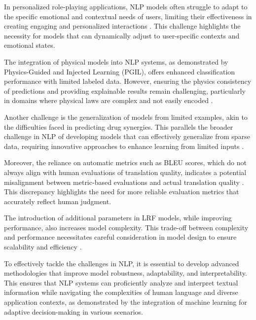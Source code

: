 In personalized role-playing applications, NLP models often struggle to adapt to the specific emotional and contextual needs of users, limiting their effectiveness in creating engaging and personalized interactions \cite{tao2024rolecraftglmadvancingpersonalizedroleplaying}. This challenge highlights the necessity for models that can dynamically adjust to user-specific contexts and emotional states.



The integration of physical models into NLP systems, as demonstrated by Physics-Guided and Injected Learning (PGIL), offers enhanced classification performance with limited labeled data. However, ensuring the physics consistency of predictions and providing explainable results remain challenging, particularly in domains where physical laws are complex and not easily encoded \cite{huang2022physicallyexplainablecnnsar}.



Another challenge is the generalization of models from limited examples, akin to the difficulties faced in predicting drug synergies. This parallels the broader challenge in NLP of developing models that can effectively generalize from sparse data, requiring innovative approaches to enhance learning from limited inputs \cite{edwards2023synergptincontextlearningpersonalized}.



Moreover, the reliance on automatic metrics such as BLEU scores, which do not always align with human evaluations of translation quality, indicates a potential misalignment between metric-based evaluations and actual translation quality \cite{bogoychev2020domaintranslationesenoisesynthetic}. This discrepancy highlights the need for more reliable evaluation metrics that accurately reflect human judgment.



The introduction of additional parameters in LRF models, while improving performance, also increases model complexity. This trade-off between complexity and performance necessitates careful consideration in model design to ensure scalability and efficiency \cite{zheng2023layerwiserepresentationfusioncompositional}.



To effectively tackle the challenges in NLP, it is essential to develop advanced methodologies that improve model robustness, adaptability, and interpretability. This ensures that NLP systems can proficiently analyze and interpret textual information while navigating the complexities of human language and diverse application contexts, as demonstrated by the integration of machine learning for adaptive decision-making in various scenarios. \cite{pandy2024advancementsroboticsprocessautomation}



